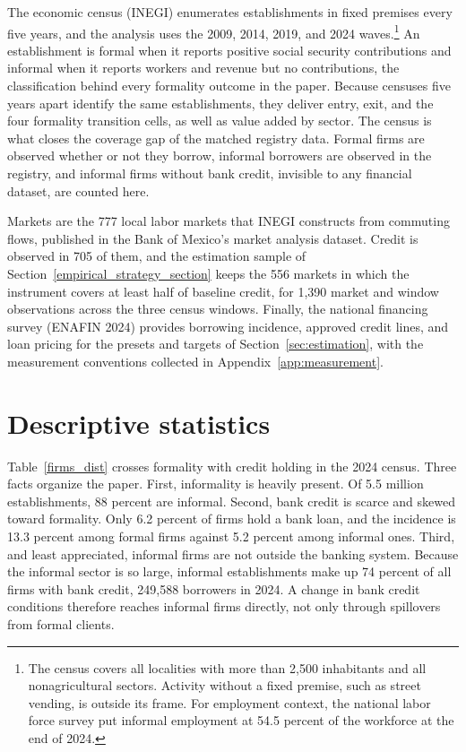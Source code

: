 \documentclass[12pt]{article}
\begin{document}
The economic census (INEGI) enumerates establishments in fixed premises every five years, and the analysis uses the 2009, 2014, 2019, and 2024 waves.\footnote{The census covers all localities with more than 2{,}500 inhabitants and all nonagricultural sectors. Activity without a fixed premise, such as street vending, is outside its frame. For employment context, the national labor force survey put informal employment at 54.5 percent of the workforce at the end of 2024.} An establishment is formal when it reports positive social security contributions and informal when it reports workers and revenue but no contributions, the classification behind every formality outcome in the paper. Because censuses five years apart identify the same establishments, they deliver entry, exit, and the four formality transition cells, as well as value added by sector. The census is what closes the coverage gap of the matched registry data. Formal firms are observed whether or not they borrow, informal borrowers are observed in the registry, and informal firms without bank credit, invisible to any financial dataset, are counted here.

Markets are the 777 local labor markets that INEGI constructs from commuting flows, published in the Bank of Mexico's market analysis dataset. Credit is observed in 705 of them, and the estimation sample of Section~\ref{empirical_strategy_section} keeps the 556 markets in which the instrument covers at least half of baseline credit, for 1{,}390 market and window observations across the three census windows. Finally, the national financing survey (ENAFIN 2024) provides borrowing incidence, approved credit lines, and loan pricing for the presets and targets of Section~\ref{sec:estimation}, with the measurement conventions collected in Appendix~\ref{app:measurement}.


\section{Descriptive statistics}
\label{sec:descriptives}

Table~\ref{firms_dist} crosses formality with credit holding in the 2024 census. Three facts organize the paper. First, informality is heavily present. Of 5.5 million establishments, 88 percent are informal. Second, bank credit is scarce and skewed toward formality. Only 6.2 percent of firms hold a bank loan, and the incidence is 13.3 percent among formal firms against 5.2 percent among informal ones. Third, and least appreciated, informal firms are not outside the banking system. Because the informal sector is so large, informal establishments make up 74 percent of all firms with bank credit, 249{,}588 borrowers in 2024. A change in bank credit conditions therefore reaches informal firms directly, not only through spillovers from formal clients.
\end{document}
